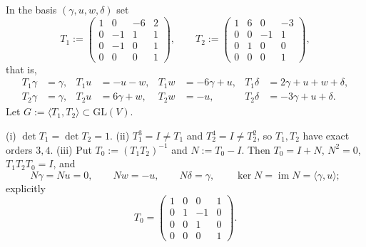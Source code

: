 \begin{definition}
In the basis $(\gamma,u,w,\delta)$ set
\[
T_1 := \begin{pmatrix} 1 & 0 & -6 & 2 \\ 0 & -1 & 1 & 1 \\ 0 & -1 & 0 & 1 \\ 0 & 0 & 0 & 1 \end{pmatrix}, \qquad
T_2 := \begin{pmatrix} 1 & 6 & 0 & -3 \\ 0 & 0 & -1 & 1 \\ 0 & 1 & 0 & 0 \\ 0 & 0 & 0 & 1 \end{pmatrix},
\]
that is,
\begin{equation}
\begin{aligned}
T_1\gamma &= \gamma, & T_1 u &= -u-w, & T_1 w &= -6\gamma+u, & T_1\delta &= 2\gamma+u+w+\delta, \\
T_2\gamma &= \gamma, & T_2 u &= 6\gamma+w, & T_2 w &= -u, & T_2\delta &= -3\gamma+u+\delta.
\end{aligned} \tag{2.2}
\end{equation}
Let $G := \langle T_1, T_2\rangle \subset \mathrm{GL}(V)$.
\end{definition}

\begin{lemma}
(i) $\det T_1 = \det T_2 = 1$. (ii) $T_1^3 = I \ne T_1$ and $T_2^4 = I \ne T_2^2$, so $T_1, T_2$ have exact orders $3,4$. (iii) Put $T_0 := (T_1T_2)^{-1}$ and $N := T_0 - I$. Then $T_0 = I+N$, $N^2 = 0$, $T_1T_2T_0 = I$, and
\[
N\gamma = Nu = 0, \qquad Nw = -u, \qquad N\delta = \gamma, \qquad \ker N = \operatorname{im} N = \langle \gamma,u\rangle;
\]
explicitly
\[
T_0 = \begin{pmatrix} 1 & 0 & 0 & 1 \\ 0 & 1 & -1 & 0 \\ 0 & 0 & 1 & 0 \\ 0 & 0 & 0 & 1 \end{pmatrix}.
\]
\end{lemma}

